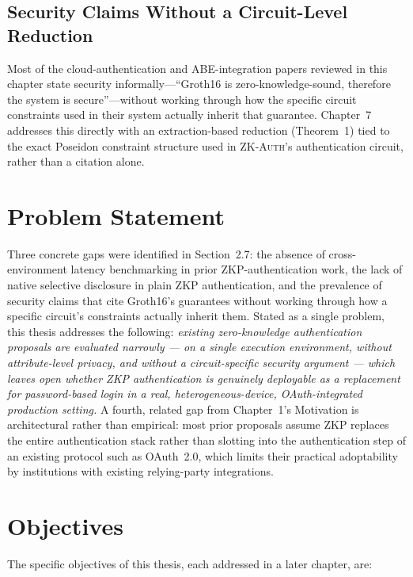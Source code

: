 \documentclass[12pt,a4paper,oneside]{report}
\begin{document}
\subsection{Security Claims Without a Circuit-Level Reduction}

Most of the cloud-authentication and ABE-integration papers reviewed in
this chapter state security informally---``Groth16 is
zero-knowledge-sound, therefore the system is secure''---without working
through how the specific circuit constraints used in their system
actually inherit that guarantee. Chapter~7 addresses this directly with
an extraction-based reduction (Theorem~1) tied to the exact Poseidon
constraint structure used in \textsc{ZK-Auth}'s authentication circuit,
rather than a citation alone.

\section{Problem Statement}

Three concrete gaps were identified in Section~2.7: the absence of
cross-environment latency benchmarking in prior ZKP-authentication
work, the lack of native selective disclosure in plain ZKP
authentication, and the prevalence of security claims that cite
Groth16's guarantees without working through how a specific circuit's
constraints actually inherit them. Stated as a single problem, this
thesis addresses the following: \textit{existing zero-knowledge
authentication proposals are evaluated narrowly --- on a single
execution environment, without attribute-level privacy, and without a
circuit-specific security argument --- which leaves open whether ZKP
authentication is genuinely deployable as a replacement for
password-based login in a real, heterogeneous-device, OAuth-integrated
production setting.} A fourth, related gap from Chapter~1's Motivation
is architectural rather than empirical: most prior proposals assume ZKP
replaces the entire authentication stack rather than slotting into the
authentication step of an existing protocol such as OAuth~2.0, which
limits their practical adoptability by institutions with existing
relying-party integrations.

\section{Objectives}

The specific objectives of this thesis, each addressed in a later
chapter, are:
\end{document}
